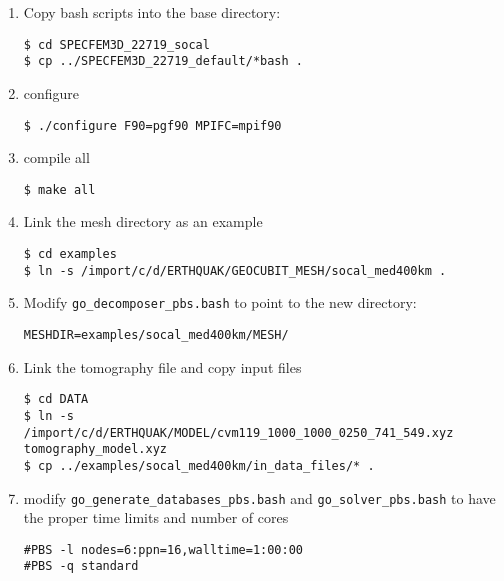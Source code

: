\documentclass[10pt,fleqn,letterpaper]{article}
\begin{document}
\begin{enumerate}
\item Copy bash scripts into the base directory:

\begin{lstlisting}
$ cd SPECFEM3D_22719_socal
$ cp ../SPECFEM3D_22719_default/*bash .
\end{lstlisting}

\item configure
\begin{lstlisting}
$ ./configure F90=pgf90 MPIFC=mpif90
\end{lstlisting}

\item compile all
\begin{lstlisting}
$ make all
\end{lstlisting}

\item Link the mesh directory as an example
\begin{lstlisting}
$ cd examples
$ ln -s /import/c/d/ERTHQUAK/GEOCUBIT_MESH/socal_med400km .
\end{lstlisting}

\item Modify \verb+go_decomposer_pbs.bash+ to point to the new directory:
\begin{lstlisting}
MESHDIR=examples/socal_med400km/MESH/
\end{lstlisting}

\item Link the tomography file and copy input files
\begin{lstlisting}
$ cd DATA
$ ln -s /import/c/d/ERTHQUAK/MODEL/cvm119_1000_1000_0250_741_549.xyz tomography_model.xyz
$ cp ../examples/socal_med400km/in_data_files/* .
\end{lstlisting}

\item modify \verb+go_generate_databases_pbs.bash+ and \verb+go_solver_pbs.bash+ to have the proper time limits and number of cores
\begin{lstlisting}
#PBS -l nodes=6:ppn=16,walltime=1:00:00
#PBS -q standard
\end{lstlisting}

%
%


\end{enumerate}
\end{document}
